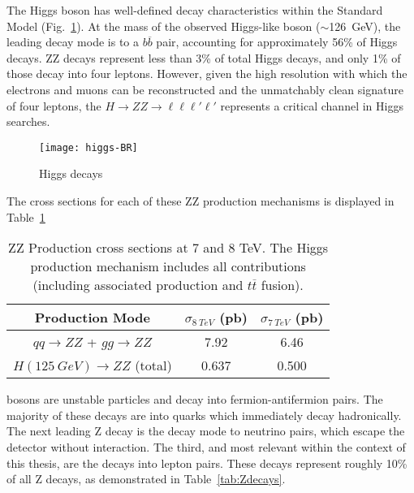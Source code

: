 The Higgs boson has well-defined decay characteristics within the Standard Model
(Fig.~\ref{fig:higgsBR}). At the mass of the observed Higgs-like boson
($\sim$126~GeV), the leading decay mode is to a $b\overline b$ pair, accounting
for approximately 56\% of Higgs decays. ZZ decays represent less than 3\% of
total Higgs decays, and only 1\% of those decay into four leptons. However,
given the high resolution with which the electrons and muons can be
reconstructed and the unmatchably clean signature of four leptons, the
$H\rightarrow ZZ \rightarrow \ell \ell \ell' \ell'$ represents a critical
channel in Higgs searches. %

\begin{figure}[h]
\centering
\texttt{[image: higgs-BR]} %
\caption{Higgs decays}
\label{fig:higgsBR}
\end{figure}

The cross sections for each of these ZZ production mechanisms is displayed in
Table~\ref{tab:Zprod}

\begin{table}[h]
\centering
\begin{tabular}{|c|c|c|}
\hline
Production Mode & $\sigma_{8~TeV}$ (pb) & $\sigma_{7~TeV}$ (pb) \\
\hline
$qq \rightarrow ZZ$ + $gg\rightarrow ZZ$ &  7.92   & 6.46 \\
$ H (125~GeV) \rightarrow ZZ$ (total)  & 0.637 & 0.500\\
\hline
\end{tabular}
\caption[ZZ Production cross sections at the LHC.]{ZZ Production cross sections at 7 and 8 TeV. The Higgs production
mechanism includes all contributions (including associated production and
$t\overline t$ fusion).}
\label{tab:Zprod}
\end{table}

\Z bosons are unstable particles and decay into fermion-antifermion pairs. The
majority of these decays are into quarks which immediately decay hadronically.
The next leading Z decay is the decay mode to neutrino pairs, which escape the
detector without interaction. The third, and most relevant within the context of
this thesis, are the decays into lepton pairs. These decays represent roughly
10\% of all Z decays, as demonstrated in Table~\ref{tab:Zdecays}.

